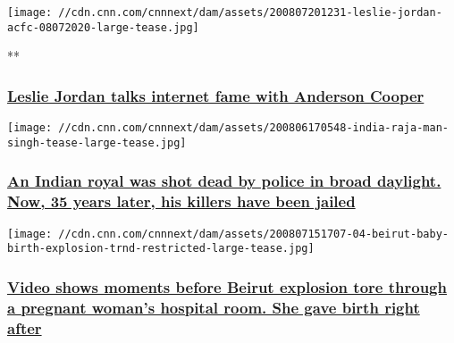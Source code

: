 \texttt{[image: //cdn.cnn.com/cnnnext/dam/assets/200807201231-leslie-jordan-acfc-08072020-large-tease.jpg]}

**

\hypertarget{leslie-jordan-talks-internet-fame-with-anderson-cooper}{%
\subsubsection{\texorpdfstring{\href{/videos/us/2020/08/07/leslie-jordan-quarantine-acfc-full-episode-vpx.cnn}{Leslie
Jordan talks internet fame with Anderson
Cooper}}{Leslie Jordan talks internet fame with Anderson Cooper}}\label{leslie-jordan-talks-internet-fame-with-anderson-cooper}}

\href{/2020/08/07/asia/india-maharaja-police-sentence-intl-dst-hnk/index.html}{}

\texttt{[image: //cdn.cnn.com/cnnnext/dam/assets/200806170548-india-raja-man-singh-tease-large-tease.jpg]}

\hypertarget{an-indian-royal-was-shot-dead-by-police-in-broad-daylight-now-35-years-later-his-killers-have-been-jailed}{%
\subsubsection{\texorpdfstring{\href{/2020/08/07/asia/india-maharaja-police-sentence-intl-dst-hnk/index.html}{An
Indian royal was shot dead by police in broad daylight. Now, 35 years
later, his killers have been
jailed}}{An Indian royal was shot dead by police in broad daylight. Now, 35 years later, his killers have been jailed}}\label{an-indian-royal-was-shot-dead-by-police-in-broad-daylight-now-35-years-later-his-killers-have-been-jailed}}

\href{/2020/08/07/world/beirut-explosion-baby-birth-trnd/index.html}{}

\texttt{[image: //cdn.cnn.com/cnnnext/dam/assets/200807151707-04-beirut-baby-birth-explosion-trnd-restricted-large-tease.jpg]}

\hypertarget{video-shows-moments-before-beirut-explosion-tore-through-a-pregnant-womans-hospital-room-she-gave-birth-right-after}{%
\subsubsection{\texorpdfstring{\href{/2020/08/07/world/beirut-explosion-baby-birth-trnd/index.html}{Video
shows moments before Beirut explosion tore through a pregnant woman's
hospital room. She gave birth right
after}}{Video shows moments before Beirut explosion tore through a pregnant woman's hospital room. She gave birth right after}}\label{video-shows-moments-before-beirut-explosion-tore-through-a-pregnant-womans-hospital-room-she-gave-birth-right-after}}

